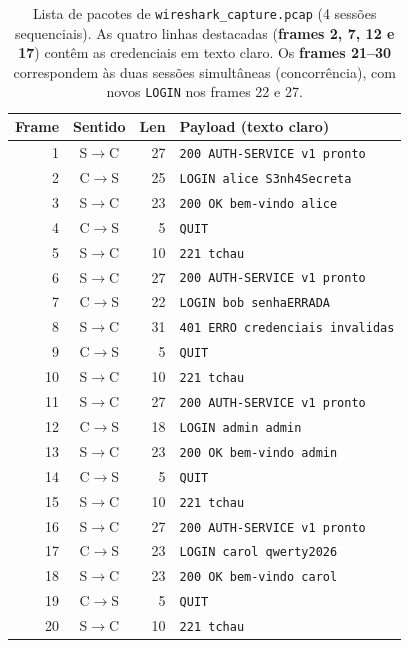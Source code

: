 \documentclass[11pt,a4paper]{article}
\begin{document}
\begin{table}[h]
\centering\small
\begin{tabular}{@{}r c r p{7.2cm}@{}}
\toprule
\textbf{Frame} & \textbf{Sentido} & \textbf{Len} & \textbf{Payload (texto claro)} \\
\midrule
1 & S$\rightarrow$C & 27 & \texttt{200 AUTH-SERVICE v1 pronto} \\
\rowcolor{corDestaque} 2 & C$\rightarrow$S & 25 & \texttt{LOGIN alice S3nh4Secreta} \\
3 & S$\rightarrow$C & 23 & \texttt{200 OK bem-vindo alice} \\
4 & C$\rightarrow$S & 5 & \texttt{QUIT} \\
5 & S$\rightarrow$C & 10 & \texttt{221 tchau} \\
6 & S$\rightarrow$C & 27 & \texttt{200 AUTH-SERVICE v1 pronto} \\
\rowcolor{corDestaque} 7 & C$\rightarrow$S & 22 & \texttt{LOGIN bob senhaERRADA} \\
8 & S$\rightarrow$C & 31 & \texttt{401 ERRO credenciais invalidas} \\
9 & C$\rightarrow$S & 5 & \texttt{QUIT} \\
10 & S$\rightarrow$C & 10 & \texttt{221 tchau} \\
11 & S$\rightarrow$C & 27 & \texttt{200 AUTH-SERVICE v1 pronto} \\
\rowcolor{corDestaque} 12 & C$\rightarrow$S & 18 & \texttt{LOGIN admin admin} \\
13 & S$\rightarrow$C & 23 & \texttt{200 OK bem-vindo admin} \\
14 & C$\rightarrow$S & 5 & \texttt{QUIT} \\
15 & S$\rightarrow$C & 10 & \texttt{221 tchau} \\
16 & S$\rightarrow$C & 27 & \texttt{200 AUTH-SERVICE v1 pronto} \\
\rowcolor{corDestaque} 17 & C$\rightarrow$S & 23 & \texttt{LOGIN carol qwerty2026} \\
18 & S$\rightarrow$C & 23 & \texttt{200 OK bem-vindo carol} \\
19 & C$\rightarrow$S & 5 & \texttt{QUIT} \\
20 & S$\rightarrow$C & 10 & \texttt{221 tchau} \\
\bottomrule
\end{tabular}
\caption{Lista de pacotes de \texttt{wireshark_capture.pcap} (4 sessões sequenciais). As
quatro linhas destacadas (\textbf{frames 2, 7, 12 e 17}) contêm as credenciais em
texto claro. Os \textbf{frames 21--30} correspondem às duas sessões simultâneas
(concorrência), com novos \texttt{LOGIN} nos frames 22 e 27.}
\label{tab:frames}
\end{table}
\end{document}
